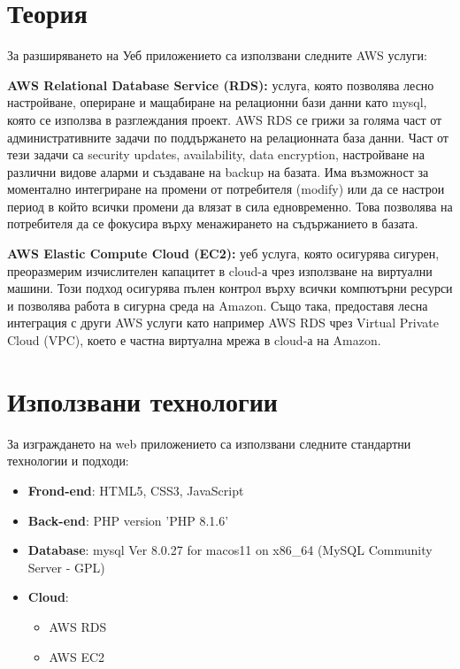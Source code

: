 \documentclass[12pt]{article}
\begin{document}
\section{Теория}
\noindent За разширяването на Уеб приложението са използвани следните AWS услуги:  
\medskip

\noindent \textbf{AWS Relational Database Service (RDS):} услуга, която позволява лесно настройване, опериране и мащабиране на релационни бази данни като mysql, която се използва в разглеждания проект. AWS RDS се грижи за голяма част от административните задачи по поддържането на релационната база данни. Част от тези задачи са security updates, availability, data encryption, настройване на различни видове аларми и създаване на backup на базата. Има възможност за моментално интегриране на промени от потребителя (modify) или да се настрои период в който всички промени да влязат в сила едновременно. Това позволява на потребителя да се фокусира върху менажирането на съдържанието в базата.
\medskip

\noindent \textbf{AWS Elastic Compute Cloud (EC2):} уеб услуга, която осигурява сигурен, преоразмерим изчислителен капацитет в cloud-а чрез използване на виртуални машини. Този подход осигурява пълен контрол върху всички компютърни ресурси и позволява работа в сигурна среда на Amazon. Също така, предоставя лесна интеграция с други AWS услуги като например AWS RDS чрез Virtual Private Cloud (VPC), което е частна виртуална мрежа в cloud-а на Amazon.
\medskip

\section{Използвани технологии}
\noindent За изграждането на web приложението са използвани следните стандартни технологии и подходи:

\begin{itemize}
\item \textbf{Frond-end}: HTML5, CSS3, JavaScript
\item \textbf{Back-end}: PHP version 'PHP 8.1.6'
\item \textbf{Database}:  mysql Ver 8.0.27 for macos11 on x86\_64 (MySQL Community Server - GPL)
\item \textbf{Cloud}:
\begin{itemize}
\item AWS RDS
\item AWS EC2
\end{itemize}
\end{itemize}
\end{document}
